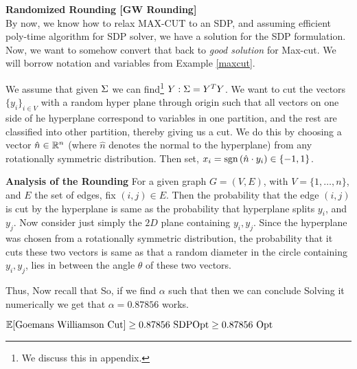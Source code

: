 \begin{example}{\bf Randomized Rounding [GW Rounding]}\\
By now, we know how to relax MAX-CUT to an SDP, and assuming efficient poly-time algorithm for SDP solver, we have a solution for the SDP formulation. Now, we want to somehow convert that back to \textit{good solution} for Max-cut. 
We will borrow notation and variables from Example \ref{maxcut}.

We assume that given $\Sigma$ we can find\footnote{We discuss this in appendix.} $Y : \Sigma = Y^T Y$. 
We want to cut the vectors $\{y_i\}_{i \in V}$ with a random hyper plane through origin such that all vectors on one side of he hyperplane correspond to variables in one partition, and the rest are classified into other partition, thereby giving us a cut. 
We do this by choosing a vector $\hat{n} \in \mathbb{R}^n$ (where $\hat{n}$ denotes the normal to the hyperplane) from any rotationally symmetric distribution. Then set, $x_i = \mbox{sgn}\left(\hat{n} \cdot y_i\right) \in \{-1, 1 \}$.

{\bf Analysis of the Rounding} 
For a given graph $G = (V, E)$, with $V =\{1, \ldots, n\}$, and $E$ the set of edges, fix $(i, j) \in E$. Then the probability that the edge $(i, j)$ is cut by the hyperplane is same as the probability that hyperplane splits $y_i$, and $y_j$. 
Now consider just simply the $2D$ plane containing $y_i, y_j$. Since the hyperplane was chosen from a rotationally symmetric distribution, the probability that it cuts these two vectors is same as that a random diameter in the circle containing $y_i, y_j$, lies in between the angle $\theta$ of these two vectors.

Thus, 
Now recall that 
So, if we find $\alpha$ such that 
then we can conclude 
Solving it numerically we get that $\alpha = 0.87856$ works.
\begin{remark}
$\mathbb{E}[\mbox{Goemans Williamson Cut}]  \geq 0.87856 \mbox{\ SDPOpt} \geq 0.87856 \mbox{\ Opt }$
\end{remark} 
\end{example}
 
